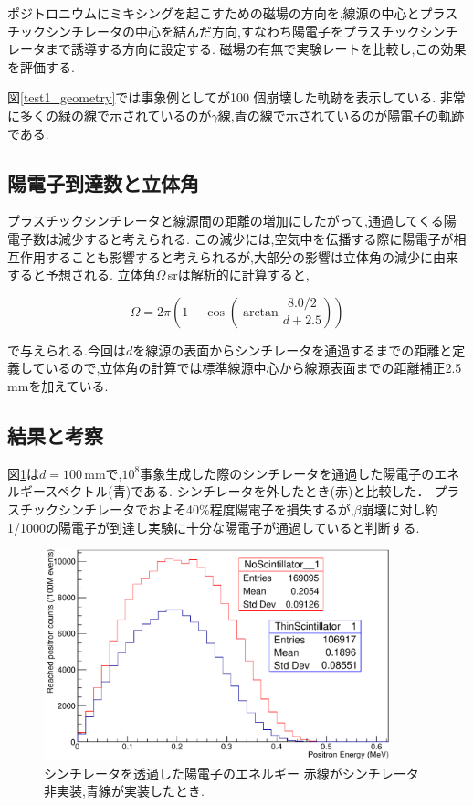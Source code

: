 ポジトロニウムにミキシングを起こすための磁場の方向を,線源の中心とプラスチックシンチレータの中心を結んだ方向,すなわち陽電子をプラスチックシンチレータまで誘導する方向に設定する.
磁場の有無で実験レートを比較し,この効果を評価する.

図\ref{test1_geometry}では事象例としてが100 個崩壊した軌跡を表示している.
非常に多くの緑の線で示されているのが$\gamma$線,青の線で示されているのが陽電子の軌跡である.

\subsection{陽電子到達数と立体角}

プラスチックシンチレータと線源間の距離の増加にしたがって,通過してくる陽電子数は減少すると考えられる.
この減少には,空気中を伝播する際に陽電子が相互作用することも影響すると考えられるが,大部分の影響は立体角の減少に由来すると予想される.
立体角$\Omega$\,srは解析的に計算すると,

\begin{equation}
	\nonumber
	\Omega = 2\pi \left( 1-\cos\left(\arctan\frac{8.0/2}{d+2.5}\right)\right)
\end{equation}

で与えられる.今回は$d$を線源の表面からシンチレータを通過するまでの距離と定義しているので,立体角の計算では標準線源中心から線源表面までの距離補正2.5 mmを加えている.

\subsection{結果と考察}

図\ref{test1}は$d=100$\,mmで,$10^8$事象生成した際のシンチレータを通過した陽電子のエネルギースペクトル(青)である. シンチレータを外したとき(赤)と比較した．
プラスチックシンチレータでおよそ40\%程度陽電子を損失するが,$\beta$崩壊に対し約1/1000の陽電子が到達し実験に十分な陽電子が通過していると判断する.

\begin{figure}[!tbp]
	\centering
		\includegraphics[width=10cm]{fig/test1.pdf}
	\caption[シンチレータを透過した陽電子のエネルギー] {シンチレータを透過した陽電子のエネルギー \newline 赤線がシンチレータ非実装,青線が実装したとき.}
	\label{test1}
\end{figure}


